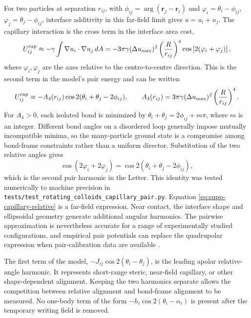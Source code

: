 \documentclass[aps,prl,onecolumn,superscriptaddress,nofootinbib]{revtex4-2}
\begin{document}
For two particles at separation \(r_{ij}\), with \(\phi_{ij}=\arg(\bm r_j-\bm r_i)\) and
\(\varphi_i=\theta_i-\phi_{ij}\), \(\varphi_j=\theta_j-\phi_{ij}\), interface additivity in
this far-field limit gives \(u=u_i+u_j\).  The capillary interaction is the cross
term in the
interface area cost,
\begin{equation}
 U_{ij}^{\rm cap}\approx
 -\gamma\int \nabla u_i\cdot\nabla u_j\,dA
 =-3\pi\gamma(\Delta u_{\max})^2
 \left(\frac{R}{r_{ij}}\right)^4
 \cos\left[2(\varphi_i+\varphi_j)\right],
 \label{eq:supp-capillary-relative}
\end{equation}
where \(\varphi_i,\varphi_j\) are the axes relative to the centre-to-centre
direction.  This is the second term in the
model's pair energy and can be written
\begin{equation}
U_{ij}^{\rm cap}\equiv -A_4(r_{ij})\cos2(\theta_i+\theta_j-2\phi_{ij}),
\qquad
A_4(r_{ij})=3\pi\gamma(\Delta u_{\max})^2\left(\frac{R}{r_{ij}}\right)^4.
\end{equation}
For \(A_4>0\), each isolated bond is minimized by
\(\theta_i+\theta_j=2\phi_{ij}+m\pi\), where \(m\) is an integer.
Different bond angles on a disordered loop generally impose mutually
incompatible minima, so the many-particle ground state is a compromise among
bond-frame constraints rather than a uniform director.
Substitution of the two relative angles gives
\begin{equation}
 \cos(2\varphi_i+2\varphi_j)
 =\cos2(\theta_i+\theta_j-2\phi_{ij}),
 \label{eq:supp-capillary-map}
\end{equation}
which is the second pair harmonic in the Letter.  This identity was tested
numerically to machine precision in
\texttt{tests/test\_rotating\_colloids\_capillary\_pair.py}.  Equation
\eqref{eq:supp-capillary-relative} is a far-field expression.  Near contact,
the interface shape and ellipsoidal geometry generate additional angular
harmonics.  The pairwise approximation is nevertheless accurate for a range
of experimentally studied configurations, and empirical pair potentials can
replace the quadrupolar expression when pair-calibration data are available
\cite{luo2019}.

The first term of the model,
\(-J_{ij}\cos2(\theta_i-\theta_j)\), is the leading apolar relative-angle
harmonic.  It represents short-range steric, near-field capillary, or other
shape-dependent alignment.  Keeping the two harmonics separate allows the
competition between relative alignment and bond-frame alignment to be
measured.  No one-body term of the form
\(-h_i\cos2(\theta_i-\alpha_i)\) is present after the temporary writing
field is removed.
\end{document}
